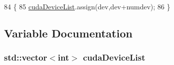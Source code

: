\begin{DoxyCode}
84                                           \{
85     \hyperlink{_queued_c_u_d_a_tracker_8cu_ab36f2f7f7b4b97a02a4597f7baef4f7a}{cudaDeviceList}.assign(dev,dev+numdev);
86 \}
\end{DoxyCode}


\subsection{Variable Documentation}
\subsubsection[{\texorpdfstring{cuda\+Device\+List}{cudaDeviceList}}]{\setlength{\rightskip}{0pt plus 5cm}std\+::vector$<$int$>$ cuda\+Device\+List\hspace{0.3cm}{\ttfamily [static]}}\hypertarget{_queued_c_u_d_a_tracker_8cu_ab36f2f7f7b4b97a02a4597f7baef4f7a}{}\label{_queued_c_u_d_a_tracker_8cu_ab36f2f7f7b4b97a02a4597f7baef4f7a}
